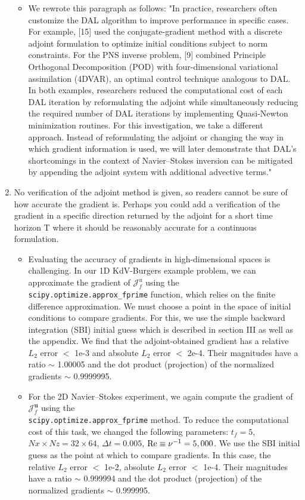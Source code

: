 \documentclass[%
 letter,
 amsmath,amssymb,
]{revtex4-2}
\begin{document}
\begin{enumerate}
\begin{itemize}
\item We rewrote this paragraph as follows: "In practice, researchers often customize the DAL algorithm to improve performance in specific cases. For example, [15] used the conjugate-gradient method with a discrete adjoint formulation to optimize initial conditions subject to norm constraints. For the PNS inverse problem, [9] combined Principle Orthogonal Decomposition (POD) with four-dimensional variational assimilation (4DVAR), an optimal control technique analogous to DAL. In both examples, researchers reduced the computational cost of each DAL iteration by reformulating the adjoint while simultaneously reducing the required number of DAL iterations by implementing Quasi-Newton minimization routines. For this investigation, we take a different approach. Instead of reformulating the adjoint or changing the way in which gradient information is used, we will later demonstrate that DAL's shortcomings in the context of Navier--Stokes inversion can be mitigated by appending the adjoint system with additional advective terms."

\end{itemize}\color{black}\item No verification of the adjoint method is given, so readers cannot  be sure of how accurate the gradient is. Perhaps you could add a  verification of the gradient in a specific direction returned by the  adjoint for a short time horizon T where it should be reasonably  accurate for a continuous formulation. \\
\color{blue}\begin{itemize}

\item Evaluating the accuracy of gradients in high-dimensional spaces is challenging. In our 1D KdV-Burgers example problem, we can approximate the gradient of $\mathcal{J}^u_f$ using the \texttt{scipy.optimize.approx\_fprime} function, which relies on the finite difference approximation. We must choose a point in the space of initial conditions to compare gradients. For this, we use the simple backward integration (SBI) initial guess which is described in section III as well as the appendix. We find that the adjoint-obtained gradient has a relative $L_2$ error $<$ 1e-3 and absolute $L_2$ error $<$ 2e-4. Their magnitudes have a ratio $\sim$ 1.00005 and the dot product (projection) of the normalized gradients $\sim$ 0.9999995.
\item For the 2D Navier--Stokes experiment, we again compute the gradient of $\mathcal{J}^{\mathbf{u}}_f$ using the \\ \texttt{scipy.optimize.approx\_fprime} method. To reduce the computational cost of this task, we changed the following parameters: $t_f=5$, $Nx \times Nz = 32 \times 64$, $\Delta t = 0.005$, $\rm{Re}\equiv \nu^{-1} = 5,000$. We use the SBI initial guess as the point at which to compare gradients. In this case, the relative $L_2$ error $<$ 1e-2, absolute $L_2$ error $<$ 1e-4. Their magnitudes have a ratio $\sim$ 0.999994 and the dot product (projection) of the normalized gradients $\sim$ 0.999995.


\end{itemize}
\end{enumerate}
\end{document}
